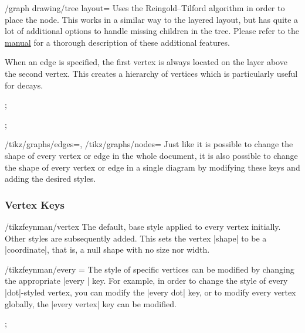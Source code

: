 \documentclass[a4paper,final]{ltxdoc}
\providecommand{\pgfmanual}{\href{http://mirrors.ctan.org/graphics/pgf/base/doc/pgfmanual.pdf}{\tikzname{} manual}}
\begin{document}
\begin{key}{/graph drawing/tree layout=}
  Uses the Reingold--Tilford algorithm in order to place the node.  This works
  in a similar way to the layered layout, but has quite a lot of additional
  options to handle missing children in the tree.  Please refer to the
  \pgfmanual{} for a thorough description of these additional features.

  When an edge is specified, the first vertex is always located on the layer
  above the second vertex.  This creates a hierarchy of vertices which is
  particularly useful for decays.

\begin{codeexample}[]
;
\end{codeexample}
\begin{codeexample}[]
;
\end{codeexample}
\end{key}

\begin{keylist}{%
  /tikz/graphs/edges=,
  /tikz/graphs/nodes=}
  Just like it is possible to change the shape of every vertex or edge in the
  whole document, it is also possible to change the shape of every vertex or
  edge in a single diagram by modifying these keys and adding the desired
  styles.
\end{keylist}

\subsubsection{Vertex Keys}
\label{subsubsec:vertex_keys}

\begin{key}{/tikzfeynman/vertex}
  The default, base style applied to every vertex initially.  Other styles
  are subsequently added.  This sets the vertex |shape| to be a |coordinate|,
  that is, a null shape with no size nor width.
\end{key}

\begin{key}{/tikzfeynman/every =}
  The style of specific vertices can be modified by changing the appropriate
  |every | key.  For example, in order to change the style of
  every |dot|-styled vertex, you can modify the |every dot| key, or to modify
  every vertex globally, the |every vertex| key can be modified.

\begin{codeexample}[]
;
\end{codeexample}
\end{key}
\end{document}
